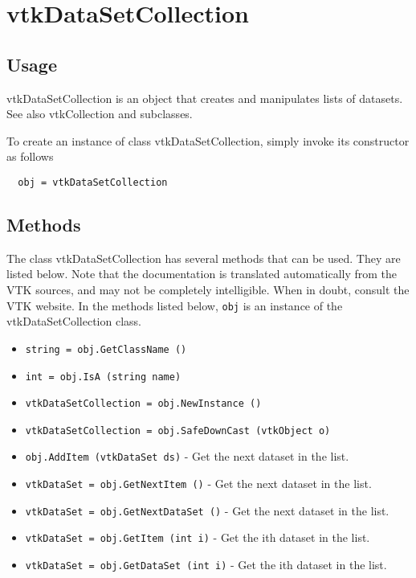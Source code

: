 \section{vtkDataSetCollection}

\subsection{Usage}

 vtkDataSetCollection is an object that creates and manipulates lists of
 datasets. See also vtkCollection and subclasses.

To create an instance of class vtkDataSetCollection, simply
invoke its constructor as follows
\begin{verbatim}
  obj = vtkDataSetCollection
\end{verbatim}
\subsection{Methods}

The class vtkDataSetCollection has several methods that can be used.
  They are listed below.
Note that the documentation is translated automatically from the VTK sources,
and may not be completely intelligible.  When in doubt, consult the VTK website.
In the methods listed below, \verb|obj| is an instance of the vtkDataSetCollection class.
\begin{itemize}
\item  \verb|string = obj.GetClassName ()|

\item  \verb|int = obj.IsA (string name)|

\item  \verb|vtkDataSetCollection = obj.NewInstance ()|

\item  \verb|vtkDataSetCollection = obj.SafeDownCast (vtkObject o)|

\item  \verb|obj.AddItem (vtkDataSet ds)| -  Get the next dataset in the list.

\item  \verb|vtkDataSet = obj.GetNextItem ()| -  Get the next dataset in the list.

\item  \verb|vtkDataSet = obj.GetNextDataSet ()| -  Get the next dataset in the list.

\item  \verb|vtkDataSet = obj.GetItem (int i)| -  Get the ith dataset in the list.

\item  \verb|vtkDataSet = obj.GetDataSet (int i)| -  Get the ith dataset in the list.

\end{itemize}
